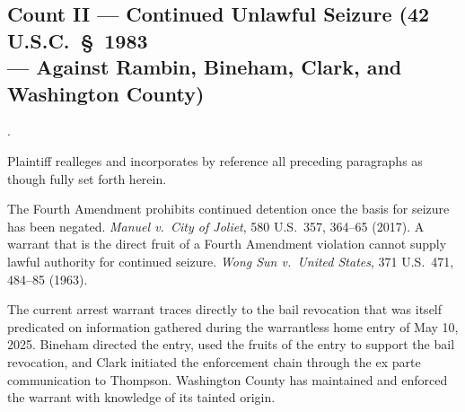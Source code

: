 \documentclass[12pt,letterpaper]{article}
\newcounter{complaintpara}
\newenvironment{paras}{%
	\begin{list}{\arabic{complaintpara}.}{%
			\setlength{\leftmargin}{0.5in}%
			\setlength{\labelwidth}{0.4in}%
			\setlength{\labelsep}{0.1in}%
			\setlength{\itemsep}{0pt}%
			\setlength{\parsep}{0pt}%
			\setlength{\topsep}{6pt}%
		}%
	}{%
	\end{list}%
}
\begin{document}
	\subsection*{Count II --- Continued Unlawful Seizure (42 U.S.C.\ \S\ 1983\\
		--- Against Rambin, Bineham, Clark, and Washington County)}
	\begin{paras}
		
		\item Plaintiff realleges and incorporates by reference all
		preceding paragraphs as though fully set forth herein.
		
		\item The Fourth Amendment prohibits continued detention once
		the basis for seizure has been negated.
		\textit{Manuel v.\ City of Joliet}, 580 U.S.\ 357, 364--65
		(2017). A warrant that is the direct fruit of a Fourth
		Amendment violation cannot supply lawful authority for
		continued seizure. \textit{Wong Sun v.\ United States},
		371 U.S.\ 471, 484--85 (1963).
		
		\item The current arrest warrant traces directly to the bail
		revocation that was itself predicated on information gathered
		during the warrantless home entry of May 10, 2025. Bineham
		directed the entry, used the fruits of the entry to support
		the bail revocation, and Clark initiated the enforcement
		chain through the ex parte communication to Thompson.
		Washington County has maintained and enforced the warrant with knowledge of its tainted origin.
		

\end{paras}
\end{document}
